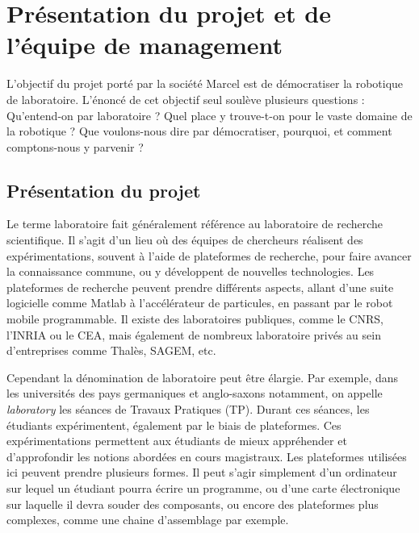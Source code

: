 \documentclass[a4paper,12pt]{report}
\begin{document}




\section{Présentation du projet et de l'équipe de management}
L'objectif du projet porté par la société Marcel est de démocratiser la robotique de laboratoire.
L'énoncé de cet objectif seul soulève plusieurs questions : Qu'entend-on par laboratoire ? Quel place y trouve-t-on pour le vaste domaine de la robotique ?
Que voulons-nous dire par démocratiser, pourquoi, et comment comptons-nous y parvenir ?\\

\subsection{Présentation du projet}

Le terme laboratoire fait généralement référence au laboratoire de recherche scientifique.
Il s'agit d'un lieu où des équipes de chercheurs réalisent des expérimentations, souvent à l'aide de plateformes de recherche,
pour faire avancer la connaissance commune, ou y développent de nouvelles technologies.
Les plateformes de recherche peuvent prendre différents aspects, allant d'une suite logicielle comme Matlab à l'accélérateur de particules, en passant par le robot mobile programmable.
Il existe des laboratoires publiques, comme le CNRS, l'INRIA ou le CEA, mais également de nombreux laboratoire privés au sein d'entreprises comme Thalès, SAGEM, etc.

Cependant la dénomination de laboratoire peut être élargie. 
Par exemple, dans les universités des pays germaniques et anglo-saxons notamment, on appelle \emph{laboratory} les séances de Travaux Pratiques (TP).
Durant ces séances, les étudiants expérimentent, également par le biais de plateformes.
Ces expérimentations permettent aux étudiants de mieux appréhender et d'approfondir les notions abordées en cours magistraux.
Les plateformes utilisées ici peuvent prendre plusieurs formes.
Il peut s'agir simplement d'un ordinateur sur lequel un étudiant pourra écrire un programme, 
ou d'une carte électronique sur laquelle il devra souder des composants, ou encore des plateformes plus complexes, comme une chaine d'assemblage par exemple.
\end{document}
